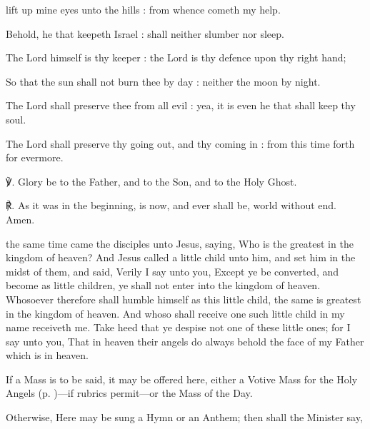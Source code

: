  lift up mine eyes unto the hills : from whence cometh my help.\par
{}
Behold, he that keepeth Israel : shall neither slumber nor sleep.\par
{}The Lord himself is thy keeper : the Lord is thy defence upon thy right hand;\par
{}So that the sun shall not burn thee by day : neither the moon by night.\par
{}The Lord shall preserve thee from all evil : yea, it is even he that shall keep thy soul.\par
{}The Lord shall preserve thy going out, and thy coming in : from this time forth for evermore.\par
℣. Glory be to the Father, and to the Son, and to the Holy Ghost.\par
℟. As it was in the beginning, is now, and ever shall be, world without end. Amen.

\vspace{-1ex}
  the same time came the disciples unto Jesus, saying, Who is the greatest in the kingdom of heaven? And Jesus called a little child unto him, and set him in the midst of them, and said, Verily I say unto you, Except ye be converted, and become as little children, ye shall not enter into the kingdom of heaven. Whosoever therefore shall humble himself as this little child, the same is greatest in the kingdom of heaven. And whoso shall receive one such little child in my name receiveth me. Take heed that ye despise not one of these little ones; for I say unto you, That in heaven their angels do always behold the face of my Father which is in heaven.

 \begin{rubric}
    If a Mass is to be said, it may be offered here, either a Votive Mass for the Holy Angels (p. \pageref{MassOfTheAngels})---if rubrics permit---or the Mass of the Day.\par
    Otherwise, Here may be sung a Hymn or an Anthem; then shall the Minister say,
\end{rubric}

